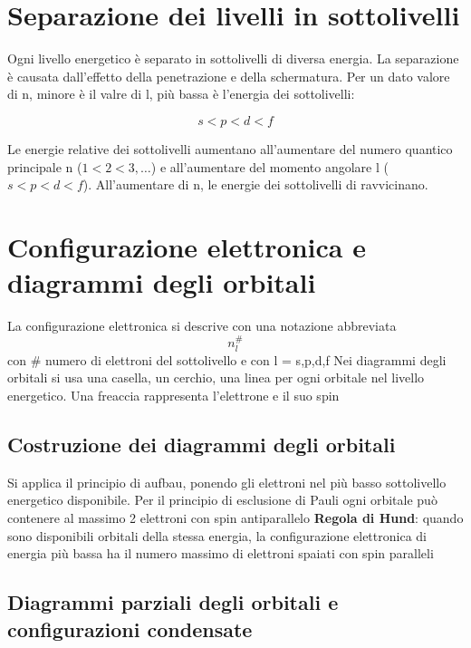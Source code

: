 \documentclass[a4paper,11pt]{report}
\begin{document}
\section{Separazione dei livelli in sottolivelli}

Ogni livello energetico è separato in sottolivelli di diversa energia.
La separazione è causata dall'effetto della penetrazione e della schermatura.
Per un dato valore di n, minore è il valre di l, più bassa è l'energia dei sottolivelli:

\begin{equation*}
	s < p < d < f
\end{equation*}

\noindent Le energie relative dei sottolivelli aumentano all'aumentare del numero quantico principale n ($1<2<3,\dots$) e all'aumentare del momento angolare l ($s<p<d<f$).
All'aumentare di n, le energie dei sottolivelli di ravvicinano.

\section{Configurazione elettronica e diagrammi degli orbitali}

La configurazione elettronica si descrive con una notazione abbreviata
\begin{equation*}
	n^\#_l
\end{equation*}
con \# numero di elettroni del sottolivello e con l = s,p,d,f \newline
Nei diagrammi degli orbitali si usa una casella, un cerchio, una linea per ogni orbitale nel livello energetico. Una freaccia rappresenta l'elettrone e il suo spin

\subsection*{Costruzione dei diagrammi degli orbitali}

Si applica il principio di aufbau, ponendo gli elettroni nel più basso sottolivello energetico disponibile. Per il principio di esclusione di Pauli ogni orbitale può contenere al massimo 2 elettroni con spin antiparallelo \newline
\textbf{Regola di Hund}: quando sono disponibili orbitali della stessa energia, la configurazione elettronica di energia più bassa ha il numero massimo di elettroni spaiati con spin paralleli

\subsection*{Diagrammi parziali degli orbitali e configurazioni condensate}
\end{document}
